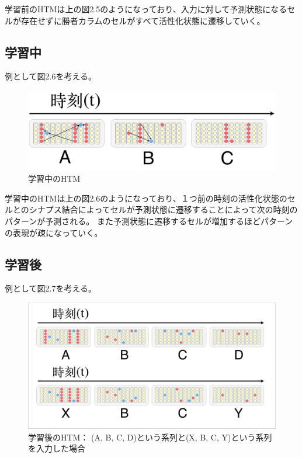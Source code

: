 学習前のHTMは上の図2.5のようになっており、入力に対して予測状態になるセルが存在せずに勝者カラムのセルがすべて活性化状態に遷移していく。

\newpage
\subsection{学習中}
例として図2.6を考える。

\begin{figure}[ht]
  \begin{center}
    \includegraphics[width=14cm]{./fig/drawing_7}
    \caption{学習中のHTM}
    \label{fig:HTM_during_learning}
  \end{center}
\end{figure}

学習中のHTMは上の図2.6のようになっており、１つ前の時刻の活性化状態のセルとのシナプス結合によってセルが予測状態に遷移することによって次の時刻のパターンが予測される。
また予測状態に遷移するセルが増加するほどパターンの表現が疎になっていく。

\subsection{学習後}
例として図2.7を考える。

\begin{figure}[ht]
  \begin{center}
    \includegraphics[width=14cm]{./fig/drawing_6}
    \caption{学習後のHTM： (A, B, C, D)という系列と(X, B, C, Y)という系列を入力した場合}
    \label{fig:HTM_after_learning}
  \end{center}
\end{figure}

